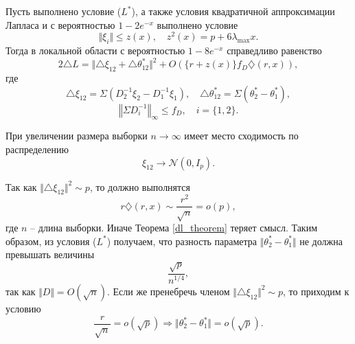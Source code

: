 \begin{theorem}
\label{dl_theorem}
Пусть выполнено условие ($L^*$), а также условия квадратичной аппроксимации  Лапласа и с вероятностью $1 - 2 e^{-x}$ выполнено условие
\[
\Vert \xi_i \Vert \leq z(x), 
\quad z^2(x) = p + 6 \lambda_{\max} x.
\] 
Тогда в локальной области с вероятностью $1 - 8 e^{-x}$ справедливо равенство
\[
2 \triangle L = \Vert \triangle \xi_{12} + \triangle \theta_{12}^*\Vert^2  + O(\{r + z(x)\} f_{D} \diamondsuit (r, x)),
\]
где
\[
\triangle \xi_{12}  = \Sigma (D_2^{-1} \xi_2 - D_1^{-1} \xi_1),
\quad
\triangle \theta_{12}^*  = \Sigma (\theta_2^* - \theta_1^*), 
\]
\[
\left\Vert  \Sigma D^{-1}_i  \right\Vert_{\infty} \leq f_D, 
\quad i = \{1,2\}.
\]
\end{theorem}    

\begin{remark} При увеличении размера выборки $n \to \infty$ имеет место сходимость по распределению 
\[
\xi_{12} \to \mathcal{N}(0, I_p).
\]
\end{remark}

\begin{remark} 
Так как $\Vert \triangle \xi_{12} \Vert^2 \sim p$, то должно выполнятся
\[
r \diamondsuit (r, x) \sim \frac{r^2}{\sqrt{n}}  = o(p),
\] 
где $n$ -- длина выборки. Иначе Теорема \ref{dl_theorem} теряет смысл. Таким образом, из условия  ($L^*$) получаем, что разность параметра $\Vert \theta_2^* - \theta_1^* \Vert$ не должна превышать величины
\[
\frac{\sqrt{p}} {n^{1/4}},
\] 
так как $\Vert D \Vert  = O(\sqrt{n})$. Если же пренебречь членом $\Vert \triangle \xi_{12} \Vert^2 \sim p$, то приходим к условию
\[
\frac{r}{\sqrt{n}}  = o(\sqrt{p})
\Rightarrow 
\Vert \theta_2^* - \theta_1^* \Vert = o(\sqrt{p}).
\]
\end{remark}

